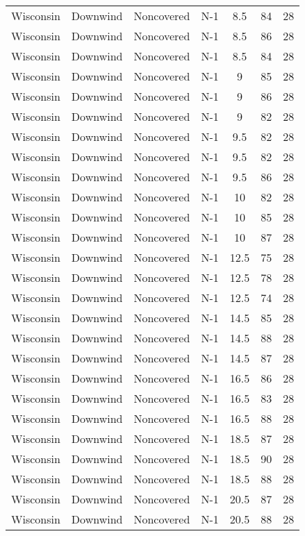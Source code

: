 \documentclass{article}
\begin{document}
\begin{longtable}[H]{ccccccc}
Wisconsin & Downwind & Noncovered & N-1 & 8.5  & 84  & 28 \\
Wisconsin & Downwind & Noncovered & N-1 & 8.5  & 86  & 28 \\
Wisconsin & Downwind & Noncovered & N-1 & 8.5  & 84  & 28 \\
Wisconsin & Downwind & Noncovered & N-1 & 9    & 85  & 28 \\
Wisconsin & Downwind & Noncovered & N-1 & 9    & 86  & 28 \\
Wisconsin & Downwind & Noncovered & N-1 & 9    & 82  & 28 \\
Wisconsin & Downwind & Noncovered & N-1 & 9.5  & 82  & 28 \\
Wisconsin & Downwind & Noncovered & N-1 & 9.5  & 82  & 28 \\
Wisconsin & Downwind & Noncovered & N-1 & 9.5  & 86  & 28 \\
Wisconsin & Downwind & Noncovered & N-1 & 10   & 82  & 28 \\
Wisconsin & Downwind & Noncovered & N-1 & 10   & 85  & 28 \\
Wisconsin & Downwind & Noncovered & N-1 & 10   & 87  & 28 \\
Wisconsin & Downwind & Noncovered & N-1 & 12.5 & 75  & 28 \\
Wisconsin & Downwind & Noncovered & N-1 & 12.5 & 78  & 28 \\
Wisconsin & Downwind & Noncovered & N-1 & 12.5 & 74  & 28 \\
Wisconsin & Downwind & Noncovered & N-1 & 14.5 & 85  & 28 \\
Wisconsin & Downwind & Noncovered & N-1 & 14.5 & 88  & 28 \\
Wisconsin & Downwind & Noncovered & N-1 & 14.5 & 87  & 28 \\
Wisconsin & Downwind & Noncovered & N-1 & 16.5 & 86  & 28 \\
Wisconsin & Downwind & Noncovered & N-1 & 16.5 & 83  & 28 \\
Wisconsin & Downwind & Noncovered & N-1 & 16.5 & 88  & 28 \\
Wisconsin & Downwind & Noncovered & N-1 & 18.5 & 87  & 28 \\
Wisconsin & Downwind & Noncovered & N-1 & 18.5 & 90  & 28 \\
Wisconsin & Downwind & Noncovered & N-1 & 18.5 & 88  & 28 \\
Wisconsin & Downwind & Noncovered & N-1 & 20.5 & 87  & 28 \\
Wisconsin & Downwind & Noncovered & N-1 & 20.5 & 88  & 28 \\

\end{longtable}
\end{document}

